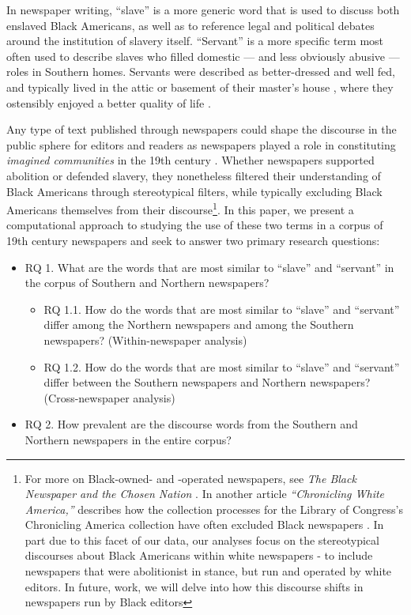 \documentclass[11pt]{article}
\begin{document}
In newspaper writing, ``slave'' is a more generic word that is used to discuss both enslaved Black Americans, as well as to reference legal and political debates around the institution of slavery itself.
``Servant'' is a more specific term most often used to describe slaves who filled domestic — and less obviously abusive — roles in Southern homes. 
Servants were described as better-dressed and well fed, and typically lived in the attic or basement of their master's house \citep{malcolm1990malcolm}, where they ostensibly enjoyed a better quality of life \citep{gatewood2000aristocrats}.

Any type of text published through newspapers could shape the discourse in the public sphere for editors and readers as newspapers played a role in constituting \textit{imagined communities} in the 19th century \citep{anderson2006imagined}. 
Whether newspapers supported abolition or defended slavery, they nonetheless filtered their understanding of Black Americans through stereotypical filters, while typically excluding Black Americans themselves from their discourse\footnote{For more on Black-owned- and -operated newspapers, see \textit{The Black Newspaper and the Chosen Nation} \citep{fagan2016black}.
In another article \textit{``Chronicling White America,''} \citeauthor{fagan2016chronicling} describes how the collection processes for the Library of Congress's Chronicling America collection have often excluded Black newspapers \citep{fagan2016chronicling}. In part due to this facet of our data, our analyses focus on the stereotypical discourses about Black Americans within white newspapers - to include newspapers that were abolitionist in stance, but run and operated by white editors. 
In future, work, we will delve into how this discourse shifts in newspapers run by Black editors}.
In this paper, we present a computational approach to studying the use of these two terms in a corpus of 19th century newspapers and seek to answer two primary research questions:

\begin{itemize}
  \item RQ 1. What are the words that are most similar to ``slave'' and ``servant'' in the corpus of Southern and Northern newspapers?
    \begin{itemize}
      \item RQ 1.1. How do the words that are most similar to ``slave'' and ``servant'' differ among the Northern newspapers and among the Southern newspapers? (Within-newspaper analysis)
      \item RQ 1.2. How do the words that are most similar to ``slave'' and ``servant'' differ between the Southern newspapers and Northern newspapers? (Cross-newspaper analysis)
    \end{itemize}
  \item RQ 2. How prevalent are the discourse words from the Southern and Northern newspapers in the entire corpus? 
\end{itemize}
\end{document}
